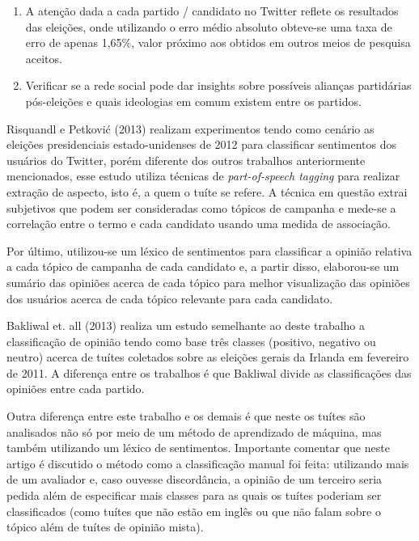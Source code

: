 \begin{enumerate}
	\item A atenção dada a cada partido / candidato no Twitter reflete os resultados das eleições, onde
	utilizando o erro médio absoluto obteve-se uma taxa de erro de apenas 1,65\%, valor próximo aos
	obtidos em outros meios de pesquisa aceitos.
	\item Verificar se a rede social pode dar insights sobre possíveis alianças partidárias pós-eleições
	e quais ideologias em comum existem entre os partidos.
\end{enumerate}

Risquandl e Petković (2013)\citep{petkovic2013} realizam experimentos tendo como cenário as
eleições presidenciais estado-unidenses de 2012 para classificar sentimentos dos usuários do
Twitter, porém diferente dos outros trabalhos anteriormente mencionados, esse estudo utiliza
técnicas de \textit{part-of-speech tagging} para realizar extração de aspecto, isto é, a quem
o tuíte se refere. A técnica em questão extrai subjetivos que podem ser consideradas	 como
tópicos de campanha e mede-se a correlação entre o termo e cada candidato usando uma medida
de associação.

Por último, utilizou-se um léxico de sentimentos para classificar a opinião relativa
a cada tópico de campanha de cada candidato e, a partir disso, elaborou-se um sumário das opiniões
acerca de cada tópico para melhor visualização das opiniões dos usuários acerca de cada tópico
relevante para cada candidato.

Bakliwal et. all (2013)\citep{bakliwal2013} realiza um estudo semelhante ao deste trabalho a classificação de opinião
tendo como base três classes (positivo, negativo ou neutro) acerca de tuítes coletados sobre
as eleições gerais da Irlanda em fevereiro de 2011. A diferença entre os trabalhos é que Bakliwal
divide as classificações das opiniões entre cada partido.

Outra diferença entre este trabalho e os demais é que neste os tuítes são analisados não só por
meio de um método de aprendizado de máquina, mas também  utilizando um léxico de sentimentos.
Importante comentar que neste artigo é discutido o método como a classificação manual foi feita:
utilizando mais de um avaliador e, caso ouvesse discordância, a opinião de um terceiro seria pedida
além de especificar mais classes para as quais os tuítes poderiam ser classificados (como tuítes
que não estão em inglês ou que não falam sobre o tópico além de tuítes de opinião mista).
